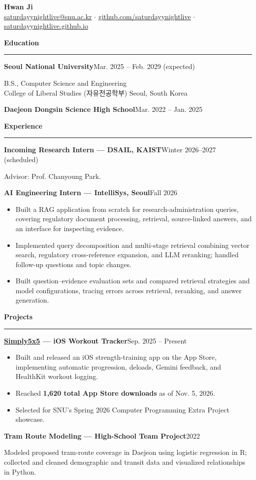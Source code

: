 \documentclass[10pt,a4paper]{article}
\newcommand{\cvsection}[1]{\par\addvspace{7pt}\Needspace{5\baselineskip}
  {\large\bfseries #1}\par\vspace{2pt}\hrule\vspace{5pt}}
\newcommand{\entry}[2]{\par\noindent\textbf{#1}\hfill{\small\color{muted}#2}\par}
\begin{document}
\begin{center}
{\LARGE\bfseries Hwan Ji}\\[5pt]
\href{mailto:saturdayynightlive@snu.ac.kr}{saturdayynightlive@snu.ac.kr}
\enspace$\cdot$\enspace
\href{https://github.com/saturdayynightlive}{github.com/saturdayynightlive}
\enspace$\cdot$\enspace
\href{https://saturdayynightlive.github.io}{saturdayynightlive.github.io}
\end{center}
\vspace{-5pt}

\cvsection{Education}
\entry{Seoul National University}{Mar. 2025 -- Feb. 2029 (expected)}
B.S., Computer Science and Engineering\\
College of Liberal Studies (자유전공학부) \hfill Seoul, South Korea
\vspace{4pt}
\entry{Daejeon Dongsin Science High School}{Mar. 2022 -- Jan. 2025}

\cvsection{Experience}
\entry{Incoming Research Intern \textnormal{--- DSAIL, KAIST}}{Winter 2026--2027 (scheduled)}
Advisor: Prof. Chanyoung Park.\par
\vspace{5pt}
\entry{AI Engineering Intern \textnormal{--- IntelliSys, Seoul}}{Fall 2026}
\begin{itemize}
\item Built a RAG application from scratch for research-administration queries, covering regulatory document processing, retrieval, source-linked answers, and an interface for inspecting evidence.
\item Implemented query decomposition and multi-stage retrieval combining vector search, regulatory cross-reference expansion, and LLM reranking; handled follow-up questions and topic changes.
\item Built question--evidence evaluation sets and compared retrieval strategies and model configurations, tracing errors across retrieval, reranking, and answer generation.
\end{itemize}

\cvsection{Projects}
\entry{\href{https://apps.apple.com/us/app/simply5x5/id6752772279}{Simply5x5} \textnormal{--- iOS Workout Tracker}}{Sep. 2025 -- Present}
\begin{itemize}
\item Built and released an iOS strength-training app on the App Store, implementing automatic progression, deloads, Gemini feedback, and HealthKit workout logging.
\item Reached \textbf{1,620 total App Store downloads} as of Nov. 5, 2026.
\item Selected for SNU's Spring 2026 Computer Programming Extra Project showcase.
\end{itemize}
\vspace{5pt}
\entry{Tram Route Modeling \textnormal{--- High-School Team Project}}{2022}
Modeled proposed tram-route coverage in Daejeon using logistic regression in R; collected and cleaned demographic and transit data and visualized relationships in Python.
\end{document}
